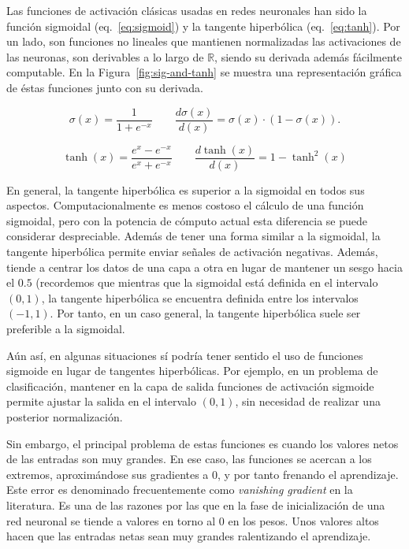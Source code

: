 Las funciones de activación clásicas usadas en redes neuronales han sido la función sigmoidal (eq.~\ref{eq:sigmoid}) y la tangente hiperbólica (eq.~\ref{eq:tanh}). Por un lado, son funciones no lineales que mantienen normalizadas las activaciones de las neuronas, son derivables a lo largo de $\mathbb{R}$, siendo su derivada además fácilmente computable. En la Figura~\ref{fig:sig-and-tanh} se muestra una representación gráfica de éstas funciones junto con su derivada.

\begin{equation}
	\sigma (x) = \frac{1}{1+e^{-x}} \qquad
	\frac{d\sigma (x)}{d(x)} = \sigma (x)\cdot (1-\sigma(x)).
	\label{eq:sigmoid}
\end{equation}

\begin{equation}
	\tanh(x) = \frac{e^x - e^{-x}}{e^x+e^{-x}} \qquad
	\frac{d\tanh (x)}{d(x)} = 1 - \tanh^2(x)
	\label{eq:tanh}
\end{equation}

En general, la tangente hiperbólica es superior a la sigmoidal en todos sus aspectos. Computacionalmente es menos costoso el cálculo de una función sigmoidal, pero con la potencia de cómputo actual esta diferencia se puede considerar despreciable. Además de tener una forma similar a la sigmoidal, la tangente hiperbólica permite enviar señales de activación negativas. Además, tiende a centrar los datos de una capa a otra en lugar de mantener un sesgo hacia el $0.5$ (recordemos que mientras que la sigmoidal está definida en el intervalo $(0, 1)$, la tangente hiperbólica se encuentra definida entre los intervalos $(-1, 1)$. Por tanto, en un caso general, la tangente hiperbólica suele ser preferible a la sigmoidal.

Aún así, en algunas situaciones sí podría tener sentido el uso de funciones sigmoide en lugar de tangentes hiperbólicas. Por ejemplo, en un problema de clasificación, mantener en la capa de salida funciones de activación sigmoide permite ajustar la salida en el intervalo $(0, 1)$, sin necesidad de realizar una posterior normalización.

Sin embargo, el principal problema de estas funciones es cuando los valores netos de las entradas son muy grandes. En ese caso, las funciones se acercan a los extremos, aproximándose sus gradientes a $0$, y por tanto frenando el aprendizaje. Este error es denominado frecuentemente como \textit{vanishing gradient} en la literatura. Es una de las razones por las que en la fase de inicialización de una red neuronal se tiende a valores en torno al $0$ en los pesos. Unos valores altos hacen que las entradas netas sean muy grandes ralentizando el aprendizaje.

